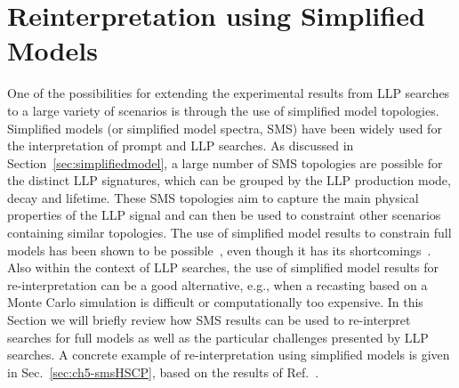 \section{Reinterpretation using Simplified Models}
\label{sec:ch5-smsReinterpretations}

One of the possibilities for extending the experimental results from LLP
searches to a large variety of scenarios is through the use of simplified model topologies.
Simplified models (or simplified model spectra, SMS) have been widely used for the interpretation of
prompt and LLP searches. As discussed in Section~\ref{sec:simplifiedmodel}, a large
number of SMS topologies are possible for the distinct LLP signatures, which
can be grouped by the LLP production mode, decay and lifetime.
These SMS topologies aim to capture the main physical properties of the LLP
signal and can then be used to constraint other scenarios containing similar
topologies.
The use of simplified model results to constrain full models has been
shown to be possible~\cite{Kraml:2013mwa,Papucci:2014rja,Belanger:2015cra,Barducci:2015zna,Arina:2015uea,Ambrogi:2017lov}, 
even though it has its shortcomings~\cite{Ambrogi:2017lov}.
Also within the context of LLP searches, the use of
simplified model results for re-interpretation can be a good alternative, e.g.,
when a recasting based on a Monte Carlo simulation is difficult or
computationally too expensive.
In this Section we will briefly review how 
SMS results can be used to re-interpret searches for full
models as well as the particular challenges presented by LLP searches.
A concrete example of re-interpretation using simplified models is given in
Sec.~\ref{sec:ch5-smsHSCP}, based on the results of Ref.~\cite{Heisig:2015yla}.


